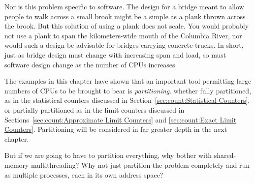 Nor is this problem specific to software.
The design for a bridge meant to allow people to walk across a small brook
might be a simple as a plank thrown across the brook.
But this solution of using a plank does not scale.
You would probably not use a plank to span the kilometers-wide mouth of
the Columbia River, nor would such a design be advisable for bridges
carrying concrete trucks.
In short, just as bridge design must change with increasing span and load,
so must software design change as the number of CPUs increases.

The examples in this chapter have shown that an important tool permitting
large numbers of CPUs to be brought to bear is \emph{partitioning}.
whether fully partitioned, as in the statistical counters discussed in
Section~\ref{sec:count:Statistical Counters},
or partially partitioned as in the limit counters discussed in
Sections~\ref{sec:count:Approximate Limit Counters} and
\ref{sec:count:Exact Limit Counters}.
Partitioning will be considered in far greater depth in the next chapter.

\QuickQuiz{}
	But if we are going to have to partition everything, why bother
	with shared-memory multithreading?
	Why not just partition the problem completely and run as
	multiple processes, each in its own address space?
 \QuickQuizEnd
